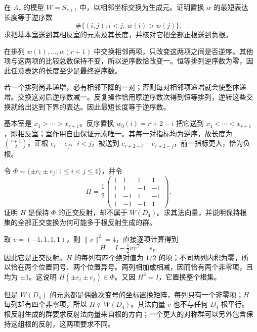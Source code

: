 \begin{exercise}\label{g1:ex:ar-inversions-and-reflections}
	在 \(A_r\) 的模型 \(W=S_{r+1}\) 中，以相邻坐标交换为生成元。证明置换 \(w\) 的最短表达长度等于逆序数
	\[
		\#\{(i,j):i<j,\ w(i)>w(j)\}.
	\]
	求把基本室送到其相反室的元素及其长度，并核对它把全部正根送到负根。
\end{exercise}
\begin{solution}
	在排列 \(w(1),\ldots,w(r+1)\) 中交换相邻两项，只改变这两项之间是否逆序。其他项与这两项的比较总数保持不变，所以逆序数恰改变一。恒等排列逆序数为零，因此任意表达的长度至少是最终逆序数。

	若一个排列尚非递增，必有相邻下降的一对；否则每对相邻项递增就会使整体递增。交换这对后逆序数减一。反复操作恰用原逆序数次得到恒等排列，逆转这些交换就给出达到下界的表达。因此最短长度等于逆序数。

	基本室是 \(x_1>\cdots>x_{r+1}\)。反序置换 \(w_0(i)=r+2-i\) 把它送到 \(x_1<\cdots<x_{r+1}\)，即相反室；室作用自由保证元素唯一。其每一对指标均为逆序，故长度为 \(\binom{r+1}{2}\)。正根 \(e_i-e_j\)、\(i<j\)，被送到 \(e_{r+2-i}-e_{r+2-j}\)，前一指标更大，恰为负根。
\end{solution}

\begin{exercise}\label{g1:ex:d4-root-symmetry-larger}
	令 \(\Phi=\{\pm e_i\pm e_j:1\le i<j\le4\}\)，并令
	\[
		H=\frac12\begin{pmatrix}
			1&1&1&1\\1&1&-1&-1\\1&-1&1&-1\\1&-1&-1&1
		\end{pmatrix}.
	\]
	证明 \(H\) 是保持 \(\Phi\) 的正交反射，却不属于 \(W(D_4)\)。求其法向量，并说明保持根集的全部正交变换为何可能多于根反射生成的群。
\end{exercise}
\begin{solution}
	取 \(v=(-1,1,1,1)\)，则 \(\lVert v\rVert^2=4\)，直接逐项计算得到
	\[
		H=I-\tfrac12vv^{\mathsf T}=s_v.
	\]
	因此它是正交反射。\(H\) 的每列有四个绝对值为 \(1/2\) 的项；不同两列内积为零，所以恰在两个位置同号、两个位置异号。两列相加或相减，因而恰有两个非零项，且均为 \(\pm1\)。这说明 \(H(\pm e_i\pm e_j)\in\Phi\)。又因 \(H^2=I\)，它置换整个根集。

	但是 \(W(D_4)\) 的元素都是偶数次变号的坐标置换矩阵，每列只有一个非零项；\(H\) 每列却有四个非零项，所以 \(H\notin W(D_4)\)。其法向量 \(v\) 也不与任何 \(D_4\) 根平行。根反射生成的群要求反射法向量来自根的方向；一个更大的对称群可以另外包含保持这组根的反射，这两项要求不同。
\end{solution}

